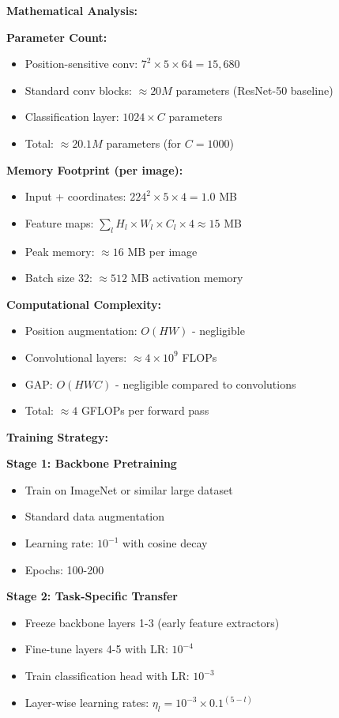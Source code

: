 \documentclass[12pt]{article}
\begin{document}
\begin{enumerate}[(a)]
{    \textbf{Mathematical Analysis:}
    
    \textbf{Parameter Count:}
    \begin{itemize}
        \item Position-sensitive conv: $7^2 \times 5 \times 64 = 15,680$
        \item Standard conv blocks: $\approx 20M$ parameters (ResNet-50 baseline)
        \item Classification layer: $1024 \times C$ parameters
        \item Total: $\approx 20.1M$ parameters (for $C=1000$)
    \end{itemize}
    
    \textbf{Memory Footprint (per image):}
    \begin{itemize}
        \item Input + coordinates: $224^2 \times 5 \times 4 = 1.0$ MB
        \item Feature maps: $\sum_{l} H_l \times W_l \times C_l \times 4 \approx 15$ MB
        \item Peak memory: $\approx 16$ MB per image
        \item Batch size 32: $\approx 512$ MB activation memory
    \end{itemize}
    
    \textbf{Computational Complexity:}
    \begin{itemize}
        \item Position augmentation: $O(HW)$ - negligible
        \item Convolutional layers: $\approx 4 \times 10^9$ FLOPs
        \item GAP: $O(HWC)$ - negligible compared to convolutions
        \item Total: $\approx 4$ GFLOPs per forward pass
    \end{itemize}
    
    \textbf{Training Strategy:}
    
    \textbf{Stage 1: Backbone Pretraining}
    \begin{itemize}
        \item Train on ImageNet or similar large dataset
        \item Standard data augmentation
        \item Learning rate: $10^{-1}$ with cosine decay
        \item Epochs: 100-200
    \end{itemize}
    
    \textbf{Stage 2: Task-Specific Transfer}
    \begin{itemize}
        \item Freeze backbone layers 1-3 (early feature extractors)
        \item Fine-tune layers 4-5 with LR: $10^{-4}$
        \item Train classification head with LR: $10^{-3}$
        \item Layer-wise learning rates: $\eta_l = 10^{-3} \times 0.1^{(5-l)}$
    \end{itemize}
    
}
\end{enumerate}
\end{document}
